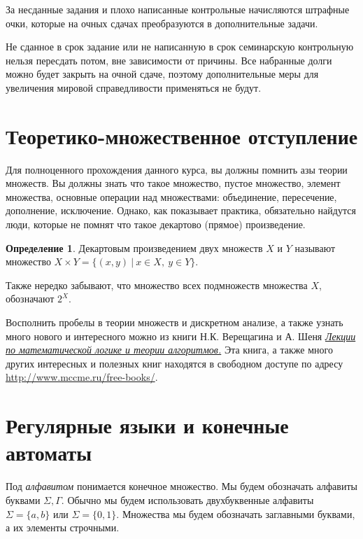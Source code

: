 \documentclass[12pt]{article}
\theoremstyle{definiton}
\theoremstyle{definition}
\newtheorem{Def}{Определение}
\begin{document}
	За несданные задания и плохо написанные контрольные начисляются штрафные очки, которые на очных сдачах преобразуются в дополнительные задачи.
	
	Не сданное в срок задание или не написанную в срок семинарскую контрольную нельзя пересдать потом, вне зависимости от причины. Все набранные долги можно будет закрыть на очной сдаче, поэтому дополнительные меры для увеличения мировой справедливости применяться не будут.

	\section{Теоретико-множественное отступление}

	Для полноценного прохождения данного курса, вы должны помнить азы теории множеств. Вы должны знать что такое множество, пустое множество, элемент множества, основные операции над множествами: объединение, пересечение, дополнение, исключение. Однако, как показывает практика, обязательно найдутся люди, которые не помнят что такое декартово (прямое) произведение.

	\begin{Def}
		Декартовым произведением двух множеств $X$ и $Y$ называют множество $X \times Y = \{ (x,y)\ |\ x \in X,\ y \in Y \}$.

	\end{Def}

	Также нередко забывают, что множество всех подмножеств множества $X$, обозначают $2^X$.


	Восполнить пробелы в теории множеств и дискретном анализе, а также узнать много нового и интересного можно из книги Н.К. Верещагина и А. Шеня \emph{\href{http://www.mccme.ru/free-books/shen/shen-logic-part1-2.pdf}{Лекции по математической логике и теории алгоритмов.} }Эта книга, а также много других интересных и полезных книг находятся в свободном доступе по адресу \url{http://www.mccme.ru/free-books/}.

	\section{ Регулярные языки и конечные автоматы }

	 Под \emph{алфавитом} понимается конечное множество. Мы будем обозначать алфавиты буквами $\Sigma, \Gamma$. Обычно мы будем использовать двухбуквенные алфавиты $\Sigma = \{a, b\}$ или  $\Sigma = \{0, 1\}$. Множества мы будем обозначать заглавными буквами, а их элементы строчными. 
\end{document}
